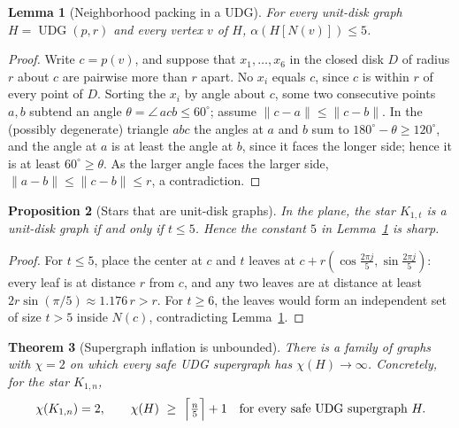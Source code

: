 \documentclass[a4paper,fleqn]{cas-sc}
\newtheorem{theorem}{Theorem}[section]
\newtheorem{proposition}[theorem]{Proposition}
\newtheorem{lemma}[theorem]{Lemma}
\newcommand{\UDG}{\operatorname{UDG}}
\newcommand{\indep}{\alpha}
\begin{document}
\begin{lemma}[Neighborhood packing in a UDG]
\label{lem:packing}
For every unit-disk graph $H=\UDG(p,r)$ and every vertex $v$ of $H$,
$\indep(H[N(v)])\le 5$.
\end{lemma}

\begin{proof}
Write $c=p(v)$, and suppose that $x_1,\dots,x_6$ in the closed disk $D$ of radius $r$
about $c$ are pairwise more than $r$ apart. No $x_i$ equals $c$, since $c$ is within
$r$ of every point of $D$. Sorting the $x_i$ by angle about $c$, some two consecutive
points $a,b$ subtend an angle $\theta=\angle\,acb\le 60^\circ$; assume
$\lVert c-a\rVert\le\lVert c-b\rVert$. In the (possibly degenerate) triangle $abc$
the angles at $a$ and $b$ sum to $180^\circ-\theta\ge120^\circ$, and the angle at $a$
is at least the angle at $b$, since it faces the longer side; hence it is at least
$60^\circ\ge\theta$. As the larger angle faces the larger side,
$\lVert a-b\rVert\le\lVert c-b\rVert\le r$, a contradiction.
\end{proof}

\begin{proposition}[Stars that are unit-disk graphs]
\label{prop:starudg}
In the plane, the star $K_{1,t}$ is a unit-disk graph if and only if $t\le 5$. Hence
the constant $5$ in Lemma~\ref{lem:packing} is sharp.
\end{proposition}

\begin{proof}
For $t\le5$, place the center at $c$ and $t$ leaves at
$c+r(\cos\frac{2\pi j}{5},\sin\frac{2\pi j}{5})$: every leaf is at distance $r$ from
$c$, and any two leaves are at distance at least $2r\sin(\pi/5)\approx1.176\,r>r$.
For $t\ge6$, the leaves would form an independent set of size $t>5$ inside $N(c)$,
contradicting Lemma~\ref{lem:packing}.
\end{proof}

\begin{theorem}[Supergraph inflation is unbounded]
\label{thm:impossibility}
There is a family of graphs with $\chi=2$ on which every safe UDG supergraph has
$\chi(H)\to\infty$. Concretely, for the star $K_{1,n}$,
\[
  \chi(K_{1,n}) = 2, \qquad \chi(H)\ \ge\ \Bigl\lceil \tfrac{n}{5}\Bigr\rceil+1
  \quad\text{for every safe UDG supergraph } H.
\]
\end{theorem}
\end{document}
